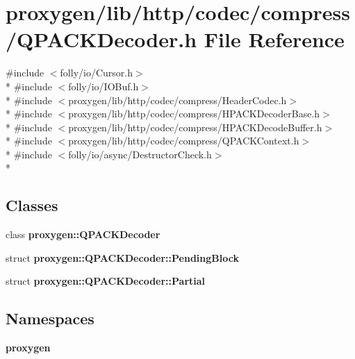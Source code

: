 \section{proxygen/lib/http/codec/compress/\+Q\+P\+A\+C\+K\+Decoder.h File Reference}
\label{QPACKDecoder_8h}
{\ttfamily \#include $<$folly/io/\+Cursor.\+h$>$}\\*
{\ttfamily \#include $<$folly/io/\+I\+O\+Buf.\+h$>$}\\*
{\ttfamily \#include $<$proxygen/lib/http/codec/compress/\+Header\+Codec.\+h$>$}\\*
{\ttfamily \#include $<$proxygen/lib/http/codec/compress/\+H\+P\+A\+C\+K\+Decoder\+Base.\+h$>$}\\*
{\ttfamily \#include $<$proxygen/lib/http/codec/compress/\+H\+P\+A\+C\+K\+Decode\+Buffer.\+h$>$}\\*
{\ttfamily \#include $<$proxygen/lib/http/codec/compress/\+Q\+P\+A\+C\+K\+Context.\+h$>$}\\*
{\ttfamily \#include $<$folly/io/async/\+Destructor\+Check.\+h$>$}\\*
\subsection*{Classes}
\begin{DoxyCompactItemize}
\item 
class {\bf proxygen\+::\+Q\+P\+A\+C\+K\+Decoder}
\item 
struct {\bf proxygen\+::\+Q\+P\+A\+C\+K\+Decoder\+::\+Pending\+Block}
\item 
struct {\bf proxygen\+::\+Q\+P\+A\+C\+K\+Decoder\+::\+Partial}
\end{DoxyCompactItemize}
\subsection*{Namespaces}
\begin{DoxyCompactItemize}
\item 
 {\bf proxygen}
\end{DoxyCompactItemize}
